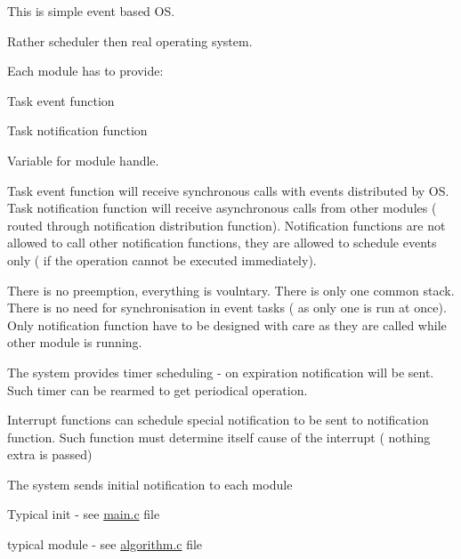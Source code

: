 This is simple event based O\+S.

Rather scheduler then real operating system.


\begin{DoxyItemize}
\item Each module has to provide\+:
\begin{DoxyEnumerate}
\item Task event function
\item Task notification function
\item Variable for module handle.
\end{DoxyEnumerate}

Task event function will receive synchronous calls with events distributed by O\+S. Task notification function will receive asynchronous calls from other modules ( routed through notification distribution function). Notification functions are not allowed to call other notification functions, they are allowed to schedule events only ( if the operation cannot be executed immediately).
\item There is no preemption, everything is voulntary. There is only one common stack. There is no need for synchronisation in event tasks ( as only one is run at once). Only notification function have to be designed with care as they are called while other module is running.
\item The system provides timer scheduling -\/ on expiration notification will be sent. Such timer can be rearmed to get periodical operation.
\item Interrupt functions can schedule special notification to be sent to notification function. Such function must determine itself cause of the interrupt ( nothing extra is passed)
\item The system sends initial notification to each module
\item Typical init -\/ see \hyperlink{a00048}{main.\+c} file
\item typical module -\/ see \hyperlink{a00038}{algorithm.\+c} file 
\end{DoxyItemize}